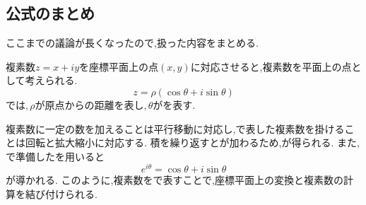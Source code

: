     \subsection{公式のまとめ}\label{節：議論のまとめ}
    ここまでの議論が長くなったので,扱った内容をまとめる.

    複素数$z=x+iy$を座標平面上の点$(x,y)$に対応させると,複素数を平面上の点として考えられる.
    \[
      z=\rho(\cos\theta+i\sin\theta)
    \]
    では,\,$\rho$が原点からの距離を表し,\,$\theta$がを表す.

    複素数に一定の数を加えることは平行移動に対応し,で表した複素数を掛けることは回転と拡大縮小に対応する.
    積を繰り返すとが加わるため,が得られる.
    また,\,で準備したを用いると
    \[
      e^{i\theta}=\cos\theta+i\sin\theta
    \]
    が導かれる.
    このように,複素数をで表すことで,座標平面上の変換と複素数の計算を結び付けられる.
